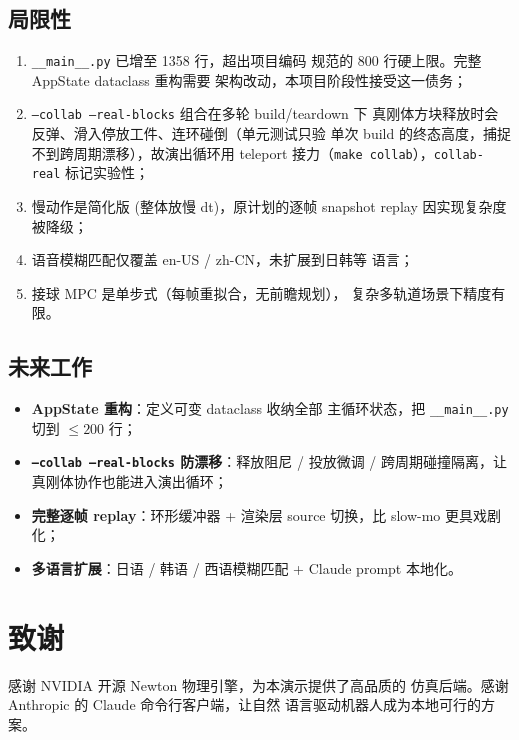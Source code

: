 \documentclass[12pt, a4paper, UTF8]{ctexart}
\begin{document}
\subsection{局限性}
\begin{enumerate}[leftmargin=*]
  \item \texttt{\_\_main\_\_.py} 已增至 1358 行，超出项目编码
    规范的 800 行硬上限。完整 AppState dataclass 重构需要
    架构改动，本项目阶段性接受这一债务；
  \item \texttt{--collab --real-blocks} 组合在多轮 build/teardown 下
    真刚体方块释放时会反弹、滑入停放工件、连环碰倒（单元测试只验
    单次 build 的终态高度，捕捉不到跨周期漂移），故演出循环用
    teleport 接力（\texttt{make collab}），\texttt{collab-real} 标记实验性；
  \item 慢动作是简化版 (整体放慢 dt)，原计划的逐帧
    snapshot replay 因实现复杂度被降级；
  \item 语音模糊匹配仅覆盖 en-US / zh-CN，未扩展到日韩等
    语言；
  \item 接球 MPC 是单步式（每帧重拟合，无前瞻规划），
    复杂多轨道场景下精度有限。
\end{enumerate}

\subsection{未来工作}
\begin{itemize}[leftmargin=*, itemsep=0pt]
  \item \textbf{AppState 重构}：定义可变 dataclass 收纳全部
    主循环状态，把 \texttt{\_\_main\_\_.py} 切到 $\leq 200$
    行；
  \item \textbf{\texttt{--collab --real-blocks} 防漂移}：释放阻尼 /
    投放微调 / 跨周期碰撞隔离，让真刚体协作也能进入演出循环；
  \item \textbf{完整逐帧 replay}：环形缓冲器 + 渲染层 source
    切换，比 slow-mo 更具戏剧化；
  \item \textbf{多语言扩展}：日语 / 韩语 / 西语模糊匹配 +
    Claude prompt 本地化。
\end{itemize}

\section*{致谢}
感谢 NVIDIA 开源 Newton 物理引擎，为本演示提供了高品质的
仿真后端。感谢 Anthropic 的 Claude 命令行客户端，让自然
语言驱动机器人成为本地可行的方案。
\end{document}
